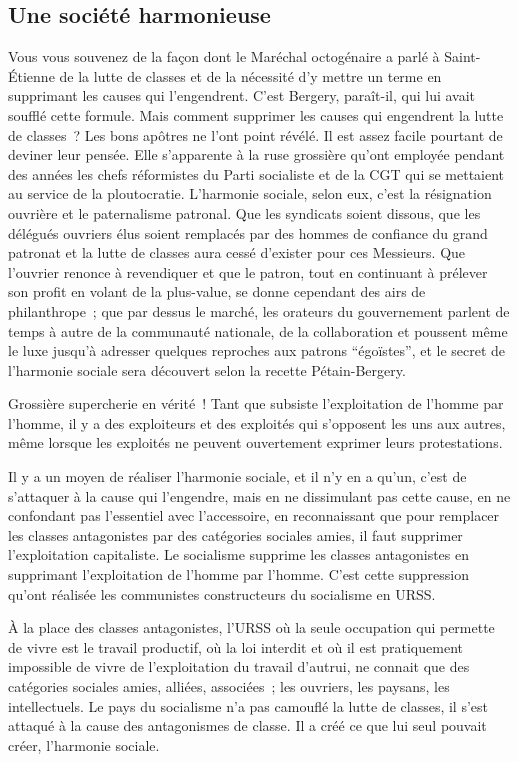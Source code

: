 \documentclass[french,twoside]{book} %
\begin{document}
\subsection[Une société harmonieuse]{Une société harmonieuse}
\noindent Vous vous souvenez de la façon dont le Maréchal octogénaire a parlé à Saint-Étienne de la lutte de classes et de la nécessité d’y mettre un terme en supprimant les causes qui l’engendrent. C’est Bergery, paraît-il, qui lui avait soufflé cette formule. Mais comment supprimer les causes qui engendrent la lutte de classes ? Les bons apôtres ne l’ont point révélé. Il est assez facile pourtant de deviner leur pensée. Elle s’apparente à la ruse grossière qu’ont employée pendant des années les chefs réformistes du Parti socialiste et de la CGT qui se mettaient au service de la ploutocratie. L’harmonie sociale, selon eux, c’est la résignation ouvrière et le paternalisme patronal. Que les syndicats soient dissous, que les délégués ouvriers élus soient remplacés par des hommes de confiance du grand patronat et la lutte de classes aura cessé d’exister pour ces Messieurs. Que l’ouvrier renonce à revendiquer et que le patron, tout en continuant à prélever son profit en volant de la plus-value, se donne cependant des airs de philanthrope ; que par dessus le marché, les orateurs du gouvernement parlent de temps à autre de la communauté nationale, de la collaboration et poussent même le luxe jusqu’à adresser quelques reproches aux patrons “égoïstes”, et le secret de l’harmonie sociale sera découvert selon la recette Pétain-Bergery.\par
Grossière supercherie en vérité ! Tant que subsiste l’exploitation de l’homme par l’homme, il y a des exploiteurs et des exploités qui s’opposent les uns aux autres, même lorsque les exploités ne peuvent ouvertement exprimer leurs protestations.\par
Il y a un moyen de réaliser l’harmonie sociale, et il n’y en a qu’un, c’est de s’attaquer à la cause qui l’engendre, mais en ne dissimulant pas cette cause, en ne confondant pas l’essentiel avec l’accessoire, en reconnaissant que pour remplacer les classes antagonistes par des catégories sociales amies, il faut supprimer l’exploitation capitaliste. Le socialisme supprime les classes antagonistes en supprimant l’exploitation de l’homme par l’homme. C’est cette suppression qu’ont réalisée les communistes constructeurs du socialisme en URSS.\par
À la place des classes antagonistes, l’URSS où la seule occupation qui permette de vivre est le travail productif, où la loi interdit et où il est pratiquement impossible de vivre de l’exploitation du travail d’autrui, ne connait que des catégories sociales amies, alliées, associées ; les ouvriers, les paysans, les intellectuels. Le pays du socialisme n’a pas camouflé la lutte de classes, il s’est attaqué à la cause des antagonismes de classe. Il a créé ce que lui seul pouvait créer, l’harmonie sociale.
\end{document}
